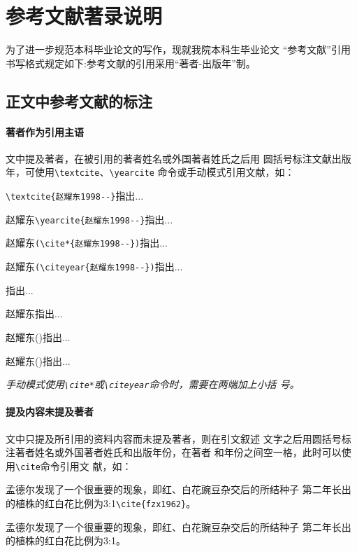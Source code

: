 \documentclass{ctexart}
\newcommand\cs[1]{\texttt{\textbackslash#1}}
\newcommand{\note}[1]{{%
  \color{magenta}{\noindent\bfseries 注意：}\emph{#1}}}
\begin{document}
\section{参考文献著录说明}

为了进一步规范本科毕业论文的写作，现就我院本科生毕业论文
\enquote{参考文献}引用书写格式规定如下:参考文献的引用采用\enquote{著者-出版年}制。

\subsection{正文中参考文献的标注}
\paragraph{著者作为引用主语}
文中提及著者，在被引用的著者姓名或外国著者姓氏之后用
圆括号标注文献出版年，可使用\cs{textcite}、\cs{yearcite}
命令或手动模式引用文献，如：

\begin{center}
  \begin{minipage}{0.45\textwidth}
    \small
    \verb|\textcite{赵耀东1998--}|指出...

    赵耀东\verb|\yearcite{赵耀东1998--}|指出...

    赵耀东\verb|(\cite*{赵耀东1998--})|指出...

    赵耀东\verb|(\citeyear{赵耀东1998--})|指出...
  \end{minipage}
  \begin{boxedminipage}{0.45\textwidth}
    \small
    \textcite{赵耀东1998--}指出...

    赵耀东指出...

    赵耀东(\cite*{赵耀东1998--})指出...

    赵耀东(\citeyear{赵耀东1998--})指出...
  \end{boxedminipage}
\end{center}

\note{手动模式使用\cs{cite*}或\cs{citeyear}命令时，需要在两端加上小括
  号。}

\paragraph{提及内容未提及著者}

文中只提及所引用的资料内容而未提及著者，则在引文叙述
文字之后用圆括号标注著者姓名或外国著者姓氏和出版年份，在著者
和年份之间空一格，此时可以使用\cs{cite}命令引用文
献，如：

\begin{center}
  \begin{minipage}{0.45\textwidth}
    \small
    孟德尔发现了一个很重要的现象，即红、白花豌豆杂交后的所结种子
      第二年长出的植株的红白花比例为3:1\verb|\cite{fzx1962}|。%
  \end{minipage}
  \begin{boxedminipage}{0.45\textwidth}
    \small
    孟德尔发现了一个很重要的现象，即红、白花豌豆杂交后的所结种子
      第二年长出的植株的红白花比例为3:1\cite{fzx1962}。%
  \end{boxedminipage}
\end{center}
\end{document}
